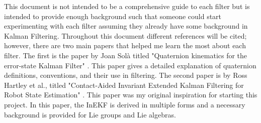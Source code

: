 This document is not intended to be a comprehensive guide to each filter but is intended to provide enough background such that someone could start experimenting with each filter assuming they already have some background in Kalman Filtering. Throughout this document different references will be cited; however, there are two main papers that helped me learn the most about each filter. The first is the paper by Joan Sol{\`{a}} titled "Quaternion kinematics for the error-state Kalman Filter" \cite{Quaternion_Kinematics_for_the_Error-state_EKF}. This paper gives a detailed explanation of quaternion definitions, conventions, and their use in filtering. The second paper is by Ross Hartley et al., titled "Contact-Aided Invariant Extended Kalman Filtering for Robot State Estimation" \cite{Contact-Aided_Invarant_EKF}. This paper was my original inspiration for starting this project. In this paper, the InEKF is derived in multiple forms and a necessary background is provided for Lie groups and Lie algebras.

